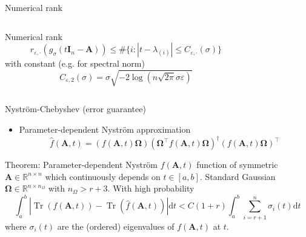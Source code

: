 \documentclass[aspectratio=169, 12pt]{beamer}
\newcommand{\mtx}[1]{\boldsymbol{#1}}
\DeclareMathOperator{\Tr}{Tr}
\begin{document}
\begin{frame}{Numerical rank}
    \begin{columns}
        \begin{column}{0.55\textwidth}
            Numerical rank
            \begin{equation}
                r_{\varepsilon, \cdot}(g_{\sigma}(t\mtx{I}_n - \mtx{A})) \leq \#\{i: |t - \lambda_{(i)}| \leq C_{\varepsilon, \cdot}(\sigma)\}
            \end{equation}
            with constant (e.g. for spectral norm)
            \begin{equation}
                C_{\varepsilon, 2}(\sigma) = \sigma \sqrt{-2 \log(n \sqrt{2 \pi} \sigma \varepsilon)}
            \end{equation}
        \end{column}
        \begin{column}{0.45\textwidth}
            \scalebox{0.6}{}
        \end{column}
    \end{columns}
    \centering
    \scalebox{1.0}{}
\end{frame}

\begin{frame}{Nystr\"om-Chebyshev (error guarantee)}
    \begin{itemize}
        \item Parameter-dependent Nystr\"om approximation
        \begin{equation}
            \widehat{f}(\mtx{A}, t) = (f(\mtx{A}, t) \mtx{\Omega}) (\mtx{\Omega}^{\top} f(\mtx{A}, t) \mtx{\Omega})^{\dagger} (f(\mtx{A}, t) \mtx{\Omega})^{\top}
        \end{equation}
    \end{itemize}
    \begin{block}{Theorem: Parameter-dependent Nystr\"om \cite{he2023parameter}}
        $f(\mtx{A}, t)$ function of symmetric $\mtx{A} \in \mathbb{R}^{n \times n}$ which
        continuously depends on $t \in [a,b]$. 
        Standard Gaussian $\mtx{\Omega} \in \mathbb{R}^{n \times n_{\Omega}}$
        with $n_{\Omega} > r + 3$. With high probability
        \begin{equation}
            \int_{a}^{b} | \Tr(f(\mtx{A}, t)) - \Tr(\widehat{f}(\mtx{A}, t))| \mathrm{d}t
                < C (1 + r) \int_{a}^{b} \sum_{i = r+1}^n \sigma_i(t) \mathrm{d}t
        \end{equation}
        where $\sigma_i(t)$ are the (ordered) eigenvalues of $f(\mtx{A}, t)$ at $t$.
    \end{block}
\end{frame}
\end{document}
